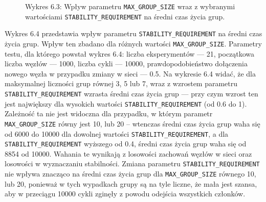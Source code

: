\documentclass[12pt, twoside, openany]{report}
\begin{document}
\begin{figure}[H]
\captionsetup{labelformat=empty}
\caption{Wykres 6.3: Wpływ parametru \texttt{MAX\_GROUP\_SIZE} wraz z wybranymi wartościami \texttt{STABILITY\_REQUIREMENT} na średni czas życia grup.}
\end{figure}

Wykres 6.4 przedstawia wpływ parametru \texttt{STABILITY\_REQUIREMENT} na średni czas życia grup. Wpływ ten zbadano dla różnych wartości \texttt{MAX\_GROUP\_SIZE}. Parametry testu, dla którego powstał wykres 6.4: liczba eksperymentów --- 21, początkowa liczba węzłów --- 1000, liczba cykli --- 10000, prawdopodobieństwo dołączenia nowego węzła w przypadku zmiany w sieci --- 0.5. Na wykresie 6.4 widać, że dla maksymalnej liczności grup równej 3, 5 lub 7, wraz z wzrostem parametru \texttt{STABILITY\_REQUIREMENT} wzrasta średni czas życia grup --- przy czym wzrost ten jest największy dla wysokich wartości \texttt{STABILITY\_REQUIREMENT} (od 0.6 do 1). Zależność ta nie jest widoczna dla przypadku, w którym parametr \texttt{MAX\_GROUP\_SIZE} równy jest 10, lub 20 -- wtenczas średni czas życia grup waha się od 6000 do 10000 dla dowolnej wartości \texttt{STABILITY\_REQUIREMENT}, a dla \texttt{STABILITY\_REQUIREMENT} wyższego od 0.4, średni czas życia grup waha się od 8854 od 10000. Wahania te wynikają z losowości zachowań węzłów w sieci oraz losowości w wyznaczaniu stabilności. Zmiana parametru \texttt{STABILITY\_REQUIREMENT} nie wpływa znacząco na średni czas życia grup dla \texttt{MAX\_GROUP\_SIZE} równego 10, lub 20, ponieważ w tych wypadkach grupy są na tyle liczne, że mała jest szansa, aby w przeciągu 10000 cykli zginęły z powodu odejścia wszystkich członków.
\end{document}
